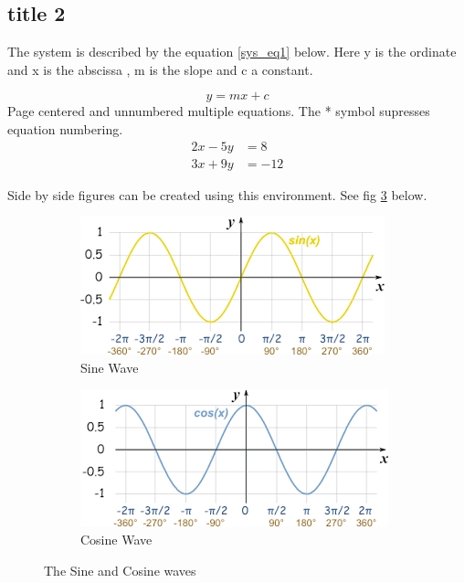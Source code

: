 \subsection{title 2}
\lipsum[3] %

\noindent The system is described by the equation \ref{sys_eq1} below. Here y is the ordinate and x is the abscissa , m is the slope and c a constant.

\begin{equation} \label{sys_eq1}
	y = mx + c
\end{equation}
\noindent Page centered and unnumbered multiple equations. The * symbol supresses equation numbering.
\begin{align*}
	2x - 5y & =  8   \\
	3x + 9y & =  -12
\end{align*}

\noindent Side by side figures can be created using this environment. See fig \ref{wave} below.
\begin{figure}[h!]
	\centering
	\begin{subfigure}[b]{0.4\textwidth}
		\includegraphics[width=\textwidth]{sinewave}
		\caption{Sine Wave}
		\label{fig:1}
	\end{subfigure}
	\hspace{20mm}
	\begin{subfigure}[b]{0.4\textwidth}
		\includegraphics[width=\linewidth]{cosine}
		\caption{Cosine Wave}
		\label{fig:2}
	\end{subfigure}
	\caption{The Sine and Cosine waves}
	\label{wave}
\end{figure}